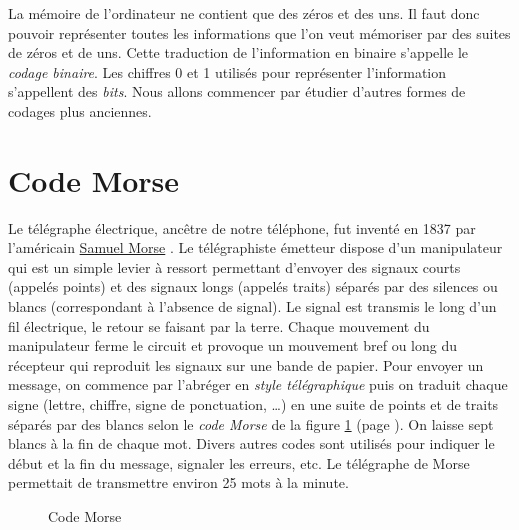 La mémoire de l'ordinateur ne contient que des zéros et des uns. Il faut donc pouvoir 
représenter toutes les informations que l'on veut mémoriser par des suites de zéros et
de uns. Cette traduction de l'information en binaire s'appelle le {\em codage binaire}. Les chiffres
0 et 1 utilisés pour représenter l'information s'appellent des {\em bits}. Nous allons
commencer par étudier d'au\-tres formes de codages plus anciennes.

\section{Code Morse}
Le télégraphe électrique, ancêtre de notre téléphone, fut inventé en 1837 par 
l'américain \href{https://fr.wikipedia.org/wiki/Samuel_Morse}{Samuel Morse} \cite{bertho}. Le télégraphiste émetteur dispose d'un manipulateur qui est un simple levier
à ressort permettant d'envoyer des signaux courts (appelés points) et des signaux longs (appelés
traits) séparés par des silences ou blancs (correspondant à l'absence de signal). Le signal est 
transmis le long d'un fil électrique, le retour se faisant par la terre. Chaque
mouvement  du manipulateur ferme le circuit et provoque un mouvement bref ou long du récepteur 
qui reproduit les signaux
sur une bande de papier.  Pour envoyer un message, on commence par l'abréger en {\em style
télégraphique} puis on traduit chaque signe (lettre, chiffre, signe de ponctuation, \ldots) en
une suite de points et de traits séparés par des blancs selon le {\em code Morse} de la figure 
\ref{fig:codemorse} (page \pageref{fig:codemorse}). On laisse sept blancs à la fin de chaque mot. 
Divers autres codes sont utilisés pour indiquer le début et la fin du message, signaler les erreurs,
etc. Le télégraphe de Morse permettait de transmettre environ 25 mots à la minute.
\begin{figure}[t]
\vspace{9.3cm}%
%
 \caption{Code Morse}\label{fig:codemorse}
\end{figure}

\vspace{5.0cm}

